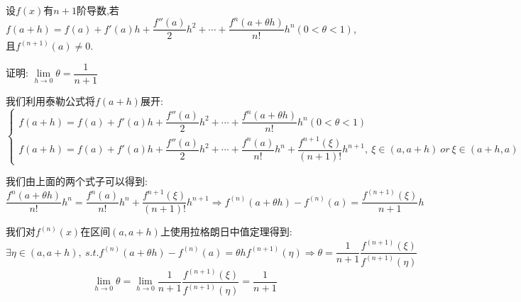 
\begin{proposition}
	设$f(x)$有$n+1$阶导数,若$f(a+h)=f(a)+f'(a)h+\dfrac{f''(a)}{2}h^2+\cdots+\dfrac{f^{n}(a+\theta h)}{n!}h^n(0<\theta<1)$,且$f^{(n+1)}(a)\neq 0$.

	证明: $\lim\limits_{h\rightarrow 0 }\theta=\dfrac{1}{n+1}$
\end{proposition}
\begin{solution}

	我们利用泰勒公式将$f(a+h)$展开:
	$$\left\lbrace
		\begin{array}{l}
			f(a+h)=f(a)+f'(a)h+\dfrac{f''(a)}{2}h^2+\cdots+\dfrac{f^{n}(a+\theta h)}{n!}h^n(0<\theta<1) \\
			f(a+h)=f(a)+f'(a)h+\dfrac{f''(a)}{2}h^2+\cdots+\dfrac{f^{n}(a)}{n!}h^n+\dfrac{f^{n+1}(\xi)}{(n+1)!}h^{n+1},\ \xi\in(a,a+h)\ or\ \xi\in(a+h,a)
		\end{array}
		\right.$$

	我们由上面的两个式子可以得到:
	$$\dfrac{f^{n}(a+\theta h)}{n!}h^n=\dfrac{f^{n}(a)}{n!}h^n+\dfrac{f^{n+1}(\xi)}{(n+1)!}h^{n+1}\Rightarrow f^{(n)}(a+\theta h)-f^{(n)}(a)=\dfrac{f^{(n+1)}(\xi)}{n+1}h$$

	我们对$f^{(n)}(x)$在区间$(a,a+h)$上使用拉格朗日中值定理得到:
	$$\exists\eta\in(a,a+h),\ s.t. f^{(n)}(a+\theta h)-f^{(n)}(a)=\theta hf^{(n+1)}(\eta)\Rightarrow \theta=\dfrac{1}{n+1}\dfrac{f^{(n+1)}(\xi)}{f^{(n+1)}(\eta)}$$
	$$\lim\limits_{h\rightarrow 0 }\theta=\lim\limits_{h\rightarrow 0 }\dfrac{1}{n+1}\dfrac{f^{(n+1)}(\xi)}{f^{(n+1)}(\eta)}=\dfrac{1}{n+1}$$

\end{solution}


